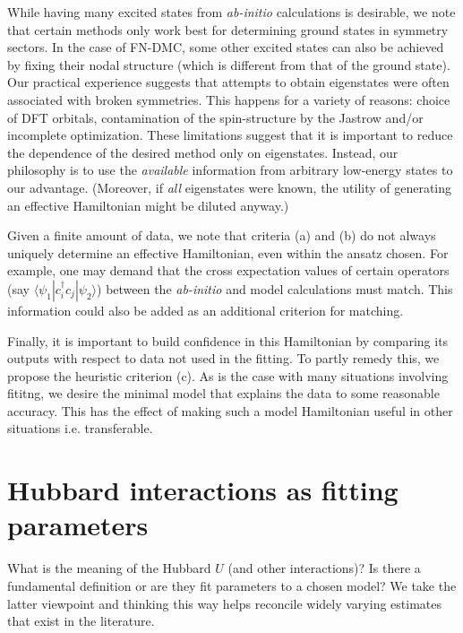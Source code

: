 \documentclass[aip,jcp,twocolumn,10pt]{revtex4-1}
\begin{document}
While having many excited states from \emph{ab-initio} calculations 
is desirable, we note that certain methods only work best for 
determining ground states in symmetry sectors. 
In the case of FN-DMC, 
some other excited states can also be achieved by fixing their 
nodal structure (which is different from that of the ground state). 
Our practical experience suggests that attempts to obtain 
eigenstates were often associated with broken symmetries. 
This happens for a variety of reasons: choice of DFT orbitals, 
contamination of the spin-structure by the 
Jastrow and/or incomplete optimization. 
These limitations suggest that it is 
important to reduce the dependence of the desired 
method only on eigenstates. Instead, our philosophy is to 
use the \emph{available} information from arbitrary 
low-energy states to our advantage. 
(Moreover, if \emph{all} eigenstates were known, the utility of 
generating an effective Hamiltonian might be diluted anyway.)
  
Given a finite amount of data, we note that criteria (a) and (b) 
do not always uniquely determine an effective Hamiltonian, 
even within the ansatz chosen. For example, one may demand that 
the cross expectation values of certain operators 
(say $\langle \psi_1 | c_i^{\dagger} c_j | \psi_2 \rangle$) 
between the \emph{ab-initio} and model calculations must match. 
This information could also be added as an 
additional criterion for matching. 

Finally, it is important to build confidence 
in this Hamiltonian by comparing its outputs with respect 
to data not used in the fitting. 
To partly remedy this, we propose the 
heuristic criterion (c). As is the case with many situations 
involving fititng, we desire 
the minimal model that explains the data to 
some reasonable accuracy. This has the effect of making such a 
model Hamiltonian useful in other situations i.e. transferable.

\section{Hubbard interactions as fitting parameters}
\label{sec:fitting}
What is the meaning of the Hubbard $U$ (and other interactions)?
Is there a fundamental definition or are they fit parameters to a chosen model? 
We take the latter viewpoint and thinking this way helps reconcile 
widely varying estimates that exist in the literature. 
\end{document}
